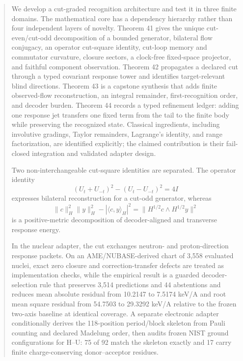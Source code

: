 \begin{abstract}
We develop a cut-graded recognition architecture and test it in three finite domains. The mathematical core has a dependency hierarchy rather than four independent layers of novelty. Theorem 41 gives the unique cut-even/cut-odd decomposition of a bounded generator, bilateral flow conjugacy, an operator cut-square identity, cut-loop memory and commutator curvature, closure sectors, a clock-free fixed-space projector, and faithful component observation. Theorem 42 propagates a declared cut through a typed covariant response tower and identifies target-relevant blind directions. Theorem 43 is a capstone synthesis that adds finite observed-flow reconstruction, an integral remainder, first-recognition order, and decoder burden. Theorem 44 records a typed refinement ledger: adding one response jet transfers one fixed term from the tail to the finite body while preserving the recognized state. Classical ingredients, including involutive gradings, Taylor remainders, Lagrange's identity, and range factorization, are identified explicitly; the claimed contribution is their fail-closed integration and validated adapter design.

Two non-interchangeable cut-square identities are separated. The operator identity
\[
  (U_t+U_{-t})^2-(U_t-U_{-t})^2=4I
\]
expresses bilateral reconstruction for a cut-odd generator, whereas
\[
 \|c\|_H^2\|y\|_H^2-|\langle c,y\rangle_H|^2
 =\|H^{1/2}c\wedge H^{1/2}y\|^2
\]
is a positive-metric decomposition of decoder-aligned and transverse response energy.

In the nuclear adapter, the cut exchanges neutron- and proton-direction response packets. On an AME/NUBASE-derived chart of 3,558 evaluated nuclei, exact zero closure and correction-transfer defects are treated as implementation checks, while the empirical result is a guarded decoder-selection rule that preserves 3,514 predictions and 44 abstentions and reduces mean absolute residual from 10.2147 to 7.5174 keV/A and root mean square residual from 54.7503 to 29.3292 keV/A relative to the frozen two-axis baseline at identical coverage. A separate electronic adapter conditionally derives the 118-position period/block skeleton from Pauli counting and declared Madelung order, then audits frozen NIST ground configurations for H--U: 75 of 92 match the skeleton exactly and 17 carry finite charge-conserving donor--acceptor residues.


\end{abstract}
